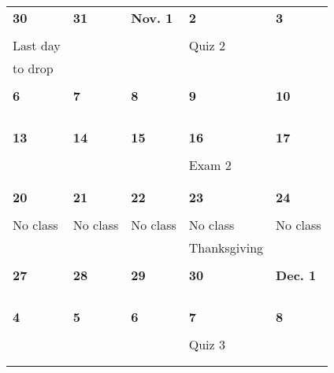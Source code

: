 \documentclass[letter, 12pt]{article}
\begin{document}
\begin{center}
\begin{tabular}{|l|l|l|l|l|}
\textbf{30} & \textbf{31} & \textbf{Nov. 1} & \textbf{2} & \textbf{3} \\
&  &  &  & \\
%
{\small Last day}&  &  &Quiz 2  & \\
%
{\small to drop}&  &  &  & \\
%
&  &  &  & \\
\hline

\textbf{6} & \textbf{7} & \textbf{8} & \textbf{9} & \textbf{10} \\
&  &  &  & \\
%
&  &  &  & \\
%
&  &  &  & \\
%
&  &  &  & \\
\hline

\textbf{13} & \textbf{14} & \textbf{15} & \textbf{16} & \textbf{17} \\
& &  &  & \\
%
&  &  &Exam 2  & \\
%
&  &  &  & \\
%
&  &  &  & \\
\hline

\textbf{20} & \textbf{21} & \textbf{22} & \textbf{23} & \textbf{24} \\
&  &  &  & \\
%
No class& No class  & No class  & No class & No class \\
%
&  &  & Thanksgiving & \\
%
&  &  &  & \\
\hline

\textbf{27} & \textbf{28} & \textbf{29} & \textbf{30} & \textbf{Dec. 1} \\
& &  &  & \\
%
&  &  &  & \\
%
&  &  &  & \\
%
&  &  &  & \\
\hline

\textbf{4} & \textbf{5} & \textbf{6} & \textbf{7} &\textbf{8} \\
&  &  &  & \\
%
&  &  &Quiz 3  & \\
%
&  &  &  & \\
%
&  &  &  & \\
\hline
\end{tabular}
\end{center}
\end{document}
